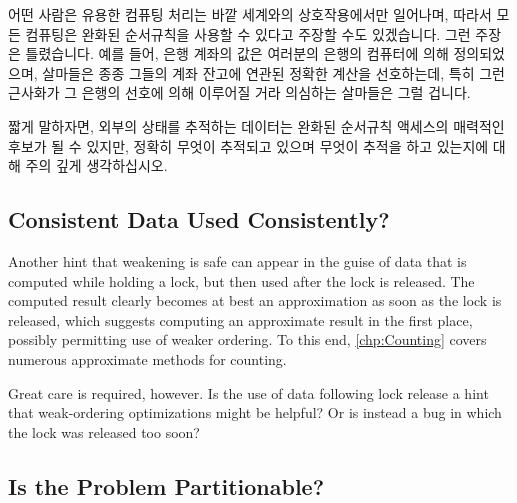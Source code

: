 어떤 사람은 유용한 컴퓨팅 처리는 바깥 세계와의 상호작용에서만 일어나며, 따라서
모든 컴퓨팅은 완화된 순서규칙을 사용할 수 있다고 주장할 수도 있겠습니다.
그런 주장은 틀렸습니다.
예를 들어, 은행 계좌의 값은 여러분의 은행의 컴퓨터에 의해 정의되었으며,
살마들은 종종 그들의 계좌 잔고에 연관된 정확한 계산을 선호하는데, 특히 그런
근사화가 그 은행의 선호에 의해 이루어질 거라 의심하는 살마들은 그럴 겁니다.

짧게 말하자면, 외부의 상태를 추적하는 데이터는 완화된 순서규칙 액세스의
매력적인 후보가 될 수 있지만, 정확히 무엇이 추적되고 있으며 무엇이 추적을 하고
있는지에 대해 주의 깊게 생각하십시오.

\iffalse

Some might argue that useful computing deals only with the outside world,
and therefore that all computing can use weak ordering.
Such arguments are incorrect.
For example, the value of your bank account is defined within your
bank's computers, and people often prefer exact computations involving
their account balances, especially those who might suspect that any such
approximations would be in the bank's favor.

In short, although data tracking external state can be an attractive
candidate for weakly ordered access, please think carefully about
exactly what is being tracked and what is doing the tracking.

\fi

\subsection{Consistent Data Used Consistently?}
\label{sec:app:questions:Consistent Data Used Consistently?}

Another hint that weakening is safe can appear in the guise of data
that is computed while holding a lock, but then used after the lock
is released.
The computed result clearly becomes at best an approximation as soon as
the lock is released, which suggests computing an approximate result
in the first place, possibly permitting use of weaker ordering.
To this end, \cref{chp:Counting} covers numerous approximate methods
for counting.

Great care is required, however.
Is the use of data following lock release a hint that weak-ordering
optimizations might be helpful?
Or is instead a bug in which the lock was released too soon?

\subsection{Is the Problem Partitionable?}
\label{sec:app:questions:Is the Problem Partitionable?}

